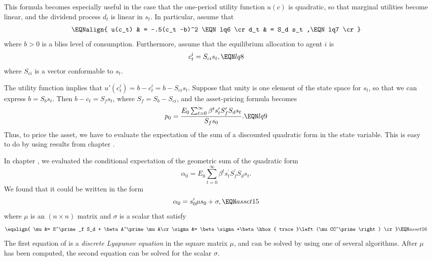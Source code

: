   This formula becomes especially useful in the case that
the one-period utility function $u(c)$ is quadratic, so that
marginal utilities become linear, and  the dividend process
$d_t$ is linear in $s_t$.  In particular,
assume that
$$ \EQNalign{ u(c_t) & = -.5(c_t -b)^2 \EQN lq6 \cr
              d_t & = S_d s_t ,\EQN lq7 \cr}$$
where $b >0$ is a bliss level of consumption.
Furthermore, assume that the equilibrium allocation to
agent $i$ is
$$ c_t^i = S_{ci} s_t, \EQN lq8 $$
where $S_{ci}$ is a vector conformable to $s_t$.




The utility function  implies that $u'(c^i_t) = b-c^i_t =
b - S_{ci} s_t$.
 Suppose that unity is one element of the state space for
$s_t$, so that we can express $b = S_b s_t$.    Then $b -c_t =
S_f s_t$, where $S_f = S_b - S_{ci}$, and
the asset-pricing formula becomes
$$ p_0 = {E_0  \sum_{t=0}^\infty \beta^t  s_t' S_f' S_d s_t \over S_f s_0} .
    \EQN lq9  $$
Thus, to price the asset, we have to evaluate the expectation
of the  sum of a discounted quadratic form in the state
variable.  This is easy to do by
 using results from chapter .


In chapter , we evaluated  the conditional expectation of the
geometric sum of the quadratic form
$$
  \alpha_0 = E_0 \sum^\infty_{t=0} \beta^t
s^\prime_t S^\prime_f S_d s_t.
 $$
We found that it could be written in the form
$$\alpha_0 = s^\prime_0 \mu s_0 + \sigma, \EQN asset15$$
where $\mu$ is an $(n\times n)$ matrix and $\sigma$ is a scalar
that satisfy
$$\eqalign{ \mu &= S^\prime_f S_d + \beta A^\prime \mu A\cr
\sigma &= \beta \sigma +\beta \hbox{ trace }\left(\mu CC^\prime
\right) \cr} \EQN asset16$$
The first equation of  is a {\it discrete Lyapunov
equation\/} in the square matrix $\mu$, and can be solved by using
one of several algorithms.
  After $\mu$ has been computed, the second equation can be
solved for the scalar $\sigma$.  

%

